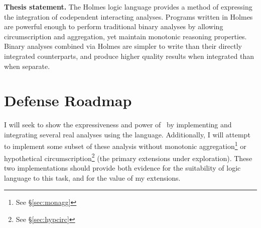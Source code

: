 \begin{inset}
{\bf Thesis statement.}
The Holmes logic language provides a method of expressing the integration of codependent interacting analyses.
Programs written in Holmes are powerful enough to perform traditional binary analyses by allowing circumscription and aggregation, yet maintain monotonic reasoning properties.
Binary analyses combined via Holmes are simpler to write than their directly integrated counterparts, and produce higher quality results when integrated than when separate.
\end{inset}

\section{Defense Roadmap}
I will seek to show the expressiveness and power of \sysname\ by implementing and integrating several real analyses using the language.
Additionally, I will attempt to implement some subset of these analysis without monotonic aggregation\footnote{See \S\ref{sec:monagg}} or hypothetical circumscription\footnote{See \S\ref{sec:hypcirc}} (the primary extensions under exploration).
These two implementations should provide both evidence for the suitability of logic language to this task, and for the value of my extensions. 

